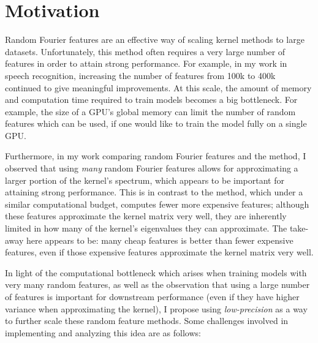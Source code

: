 \documentclass[12pt]{article}
\begin{document}
\section{Motivation}
Random Fourier features are an effective way of scaling kernel methods to large datasets.  Unfortunately, this method often requires a very large number of features in order to attain strong performance.  For example, in my work in speech recognition, increasing the number of features from 100k to 400k continued to give meaningful improvements.  At this scale, the amount of memory and computation time required to train models becomes a big bottleneck. For example, the size of a GPU's global memory can limit the number of random features which can be used, if one would like to train the model fully on a single GPU.  

Furthermore, in my work comparing random Fourier features and the \Nystrom method, I observed that using \textit{many} random Fourier features allows for approximating a larger portion of the kernel's spectrum, which appears to be important for attaining strong performance. This is in contrast to the \Nystrom method, which under a similar computational budget, computes fewer more expensive features; although these features approximate the kernel matrix very well, they are inherently limited in how many of the kernel's eigenvalues they can approximate.  The take-away here appears to be: many cheap features is better than fewer expensive features, even if those expensive features approximate the kernel matrix very well.

In light of the computational bottleneck which arises when training models with very many random features, as well as the observation that using a large number of features is important for downstream performance (even if they have higher variance when approximating the kernel), I propose using \textit{low-precision} as a way to further scale these random feature methods.
Some challenges involved in implementing and analyzing this idea are as follows:
\end{document}

